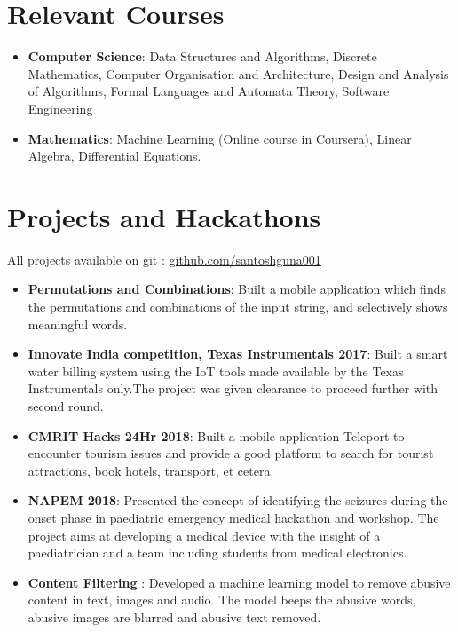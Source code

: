\documentclass[margin, centered]{res}
\begin{document}
\begin{resume}
\section{Relevant \hspace{2mm} Courses}
\begin{itemize}[leftmargin=*]
\item  \textbf{Computer Science}: Data Structures and Algorithms, Discrete Mathematics, Computer Organisation and
Architecture, Design and Analysis of Algorithms, Formal Languages and Automata Theory, Software
Engineering
\item  \textbf{Mathematics}: Machine Learning (Online course in Coursera), Linear Algebra,
Differential Equations.
\end{itemize}

\section{Projects and Hackathons}
All projects available on git : \href{https://github.com/santoshguna001}{ github.com/santoshguna001 }
\begin{itemize}[leftmargin=*]
\item  \textbf{Permutations and Combinations}: Built a mobile application which finds the permutations and
combinations of the input string, and selectively shows meaningful
words.
\item  \textbf{Innovate India competition, Texas Instrumentals 2017}: Built a smart water billing system using
the IoT tools made available by the Texas Instrumentals only.The project was given clearance to
proceed further with second round.
\item  \textbf{CMRIT Hacks 24Hr 2018}: Built a mobile application Teleport to encounter tourism issues and provide
a good platform to search for tourist attractions, book hotels, transport, et cetera. 
\item  \textbf{NAPEM 2018}: Presented the concept of identifying the seizures during the onset phase in paediatric
emergency medical hackathon and workshop. The project aims at developing a medical device with the
insight of a paediatrician and a  team including students from medical electronics.
\item \textbf{Content Filtering} : Developed a machine learning model to remove abusive content in text, images and audio. The model beeps the abusive words, abusive images are blurred and abusive text removed.
\end{itemize}




\end{resume}
\end{document}
